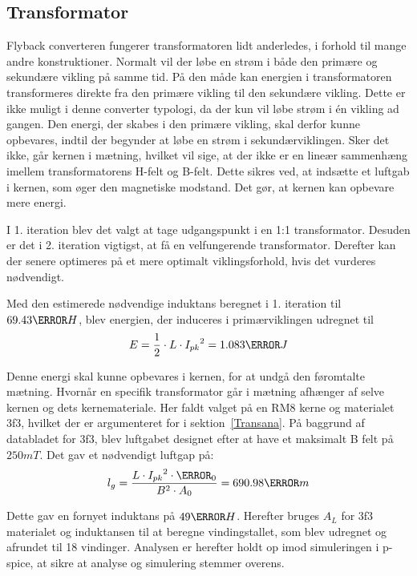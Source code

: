 \subsection{Transformator}
Flyback converteren fungerer transformatoren lidt anderledes, i forhold til mange andre konstruktioner. Normalt vil der løbe en strøm i både den primære og sekundære vikling på samme tid. På den måde kan energien i transformatoren transformeres direkte fra den primære vikling til den sekundære vikling. Dette er ikke muligt i denne converter typologi, da der kun vil løbe strøm i én vikling ad gangen. Den energi, der skabes i den primære vikling, skal derfor kunne opbevares, indtil der begynder at løbe en strøm i sekundærviklingen. Sker det ikke, går kernen i mætning, hvilket vil sige, at der ikke er en lineær sammenhæng imellem transformatorens H-felt og B-felt.
Dette sikres ved, at indsætte et luftgab i kernen, som øger den magnetiske modstand. Det gør, at kernen kan opbevare mere energi.

I 1. iteration blev det valgt at tage udgangspunkt i en 1:1 transformator. Desuden er det i 2. iteration vigtigst, at få en velfungerende transformator. Derefter kan der senere optimeres på et mere optimalt viklingsforhold, hvis det vurderes nødvendigt. 

Med den estimerede nødvendige induktans beregnet i 1. iteration til $69.43\micro H$, blev energien, der induceres i primærviklingen udregnet til \begin{equation} \label{Primary_energy}
E = \frac{1} {2} \cdot L \cdot {I_{pk}}^2 = 1.083\milli J
\end{equation}

Denne energi skal kunne opbevares i kernen, for at undgå den føromtalte mætning. Hvornår en specifik transformator går i mætning afhænger af selve kernen og dets kernemateriale. Her faldt valget på en RM8 kerne og materialet 3f3, hvilket der er argumenteret for i sektion~\ref{Transana}.
På baggrund af databladet for 3f3, blev luftgabet designet efter at have et maksimalt B felt på $250mT$. Det gav et nødvendigt luftgap på:
\begin{equation} \label{Airgap}
l_g = \frac{L \cdot {I_{pk}}^2 \cdot \micro_0}{B^2 \cdot A_0} = 690.98\micro m
\end{equation}

Dette gav en fornyet induktans på $49\micro H$. Herefter bruges $A_L$ for 3f3 materialet og induktansen til at beregne vindingstallet, som blev udregnet og afrundet til 18 vindinger.
Analysen er herefter holdt op imod simuleringen i p-spice, at sikre at analyse og simulering stemmer overens.
 
